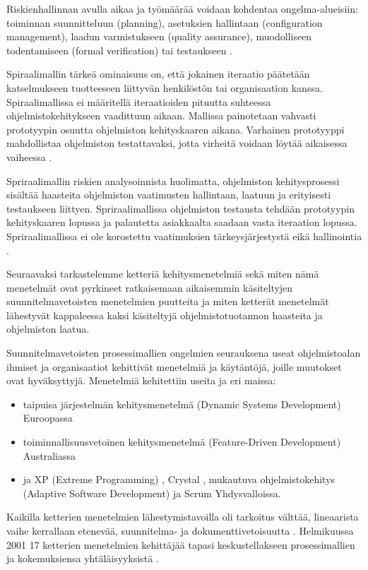 \documentclass[finnish]{tktltiki2}
\theoremstyle{definition}
\theoremstyle{remark}
\begin{document}
{Riskienhallinnan avulla aikaa ja työmäärää voidaan kohdentaa ongelma-alueisiin: toiminnan suunnitteluun (planning), asetuksien hallintaan (configuration management), laadun varmistukseen (quality assurance), muodolliseen todentamiseen (formal verification) tai testaukseen \cite{BOE88}.

Spiraalimallin tärkeä ominaisuus on, että jokainen iteraatio päätetään katselmukseen tuotteeseen liittyvän henkilöstön tai organisaation kanssa. Spiraalimallissa ei määritellä iteraatioiden pituutta suhteessa ohjelmistokehitykseen vaadittuun aikaan. Mallissa painotetaan vahvasti prototyypin osuutta ohjelmiston kehityskaaren aikana. Varhainen prototyyppi mahdollistaa ohjelmiston testattavaksi, jotta virheitä voidaan löytää aikaisessa vaiheessa \cite{BOE88}.

Spriraalimallin riskien analysoinnista huolimatta, ohjelmiston kehitysprosessi sisältää haasteita ohjelmiston vaatimusten hallintaan, laatuun ja erityisesti testaukseen liittyen. Spriraalimallissa ohjelmiston testausta tehdään prototyypin kehityskaaren lopussa ja palautetta asiakkaalta saadaan vasta iteraation lopussa. Spriraalimallissa ei ole korostettu vaatimuksien tärkeys\-järjestystä eikä hallinointia \cite{BOE88}.

Seuraavaksi tarkastelemme ketteriä kehitysmenetelmiä sekä miten nämä menetelmät ovat pyrkineet ratkaisemaan aikaisemmin käsiteltyjen suunnitelmavetoisten menetelmien puutteita ja miten ketterät menetelmät lähestyvät kappaleessa kaksi käsiteltyjä ohjelmistotuotannon haasteita ja ohjelmiston laatua.

Suunnitelmavetoisten prosessimallien ongelmien seurauksena useat ohjelmistoalan ihmiset ja organisaatiot kehittivät menetelmiä ja käytäntöjä, joille muutokset ovat hyväksyttyjä.
Menetelmiä kehitettiin useita ja eri maissa: \cite{WIC03}

\begin{itemize}
\item taipuisa järjestelmän kehitysmenetelmä (Dynamic Systems Development) Euroopassa
\item toiminnallisuusvetoinen kehitysmenetelmä (Feature-Driven Development) Australiassa
\item ja XP (Extreme Programming) \cite{BEC99}, Crystal \cite{COC05}, mukautuva ohjelmistokehitys (Adaptive Software Development) ja Scrum \cite{SCH09} Yhdysvalloissa.
\end{itemize}


Kaikilla ketterien menetelmien lähestymistavoilla oli tarkoitus välttää, lineaarista vaihe kerrallaan etenevää, suunnitelma- ja dokumenttivetoisuutta \cite{LAB03}.
Helmikuussa 2001 17 ketterien menetelmien kehittäjää tapasi keskustellakseen prosessimallien ja kokemuksiensa yhtäläisyyksistä  \cite{WIC03}.

}
\end{document}
